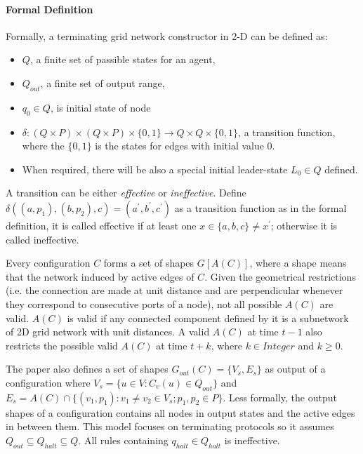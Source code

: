 \paragraph{Formal Definition}
Formally, a terminating grid network constructor in 2-D can be defined as:
\begin{itemize}
  \item $Q$, a finite set of passible states for an agent,
  \item $Q_{out}$, a finite set of output range,
  \item $q_{0} \in Q $, is initial state of node
  \item $\delta: (Q \times P ) \times (Q \times P) \times \{0,1\} \to Q \times Q \times \{0,1\}$, a transition function, where the $\{0,1\}$ is the states for edges with initial value 0.
  \item When required, there will be also a special initial leader-state $L_{0} \in Q $ defined.
\end{itemize}
\par\noindent
A transition can be either \textit{effective}
or \textit{ineffective}. Define $\delta((a, p_{1}), (b, p_{2}), c) = (a^{'}, b^{'},c^{'})$ as a transition function
as in the formal definition, it is called effective if at least one $x \in \{a,b,c\} \not= x^{'} $; otherwise it is called ineffective.

\par\noindent
Every configuration $C$ forms a set of shapes $G[A(C)]$, where a shape means that the network induced
by active edges of $C$. Given the geometrical restrictions (i.e. the connection are
made at unit distance and are perpendicular whenever they correspond to consecutive ports of a node),
not all possible $A(C)$ are valid. $A(C)$ is valid if any connected component defined by it is a
subnetwork of 2D grid network with unit distances. A valid $A(C)$ at time $t -1$ also restricts the
possible valid $A(C)$ at time $t + k$, where $k \in Integer$ and $k \geq 0 $.

\par\noindent
The paper \cite{Mi17} also defines a set of
shapes $G_{out}(C) = \{V_{s}, E_{s}\}$ as output of a configuration where $V_{s} = \{u \in V : C_{v}(u) \in Q_{out} \}$
and $E_{s} = A(C) \cap \{ (v_{1}, p_{1}) : v_{1} \not= v_{2} \in V_{s}; p_{1}, p_{2} \in P \}$.
Less formally, the output shapes of a configuration contains all nodes in output states and the active edges in between them.
This model focuses on terminating protocols so it assumes $Q_{out} \subseteq Q_{halt} \subseteq Q $.
All rules containing $q_{halt} \in Q_{halt} $ is ineffective.


